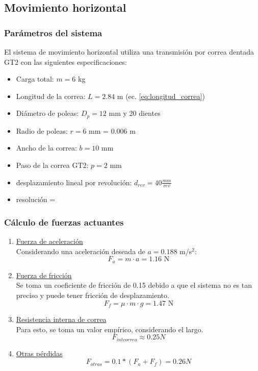 \subsection{Movimiento horizontal}

\subsubsection{Parámetros del sistema}

El sistema de movimiento horizontal utiliza una transmisión por correa dentada GT2 con las siguientes especificaciones:

\begin{itemize}[label=$\bullet$]
    \item Carga total: $m = 6$ kg
    \item Longitud de la correa: $L = 2.84$ m (ec. \ref{eq:longitud_correa})
    \item Diámetro de poleas: $D_p = 12$ mm y 20 dientes
    \item Radio de poleas: $r = 6$ mm = $0.006$ m
    \item Ancho de la correa: $b = 10$ mm
    \item Paso de la correa GT2: $p = 2$ mm
    \item desplazamiento lineal por revolución: $d_{rev} = 40 \frac{mm}{rev}$
    \item resolución = 
\end{itemize}

\subsubsection{Cálculo de fuerzas actuantes}
\begin{enumerate}
    \item \underline{Fuerza de aceleración}\\
        Considerando una aceleración deseada de $a = 0.188$ m/s$^2$:
        \begin{equation}
        F_a = m \cdot a = 1.16\text{ N}
        \end{equation}
    \item \underline{Fuerza de fricción}\\
        Se toma un coeficiente de fricción de 0.15 debido a que el sistema no es tan preciso y puede tener fricción de desplazamiento.
        \begin{equation}
            F_f = \mu \cdot m \cdot g = 1.47 \text{ N}
        \end{equation}
    \item \underline{Resistencia interna de correa}\\
        Para esto, se toma un valor empírico, considerando el largo.
        \begin{equation}
        F_{intcorrea} \approx 0.25N
        \end{equation}
    \item \underline{Otras pérdidas}\\
        \begin{equation}
            F_{otras}= 0.1*(F_a+F_f)=0.26N
        \end{equation}
\end{enumerate}

